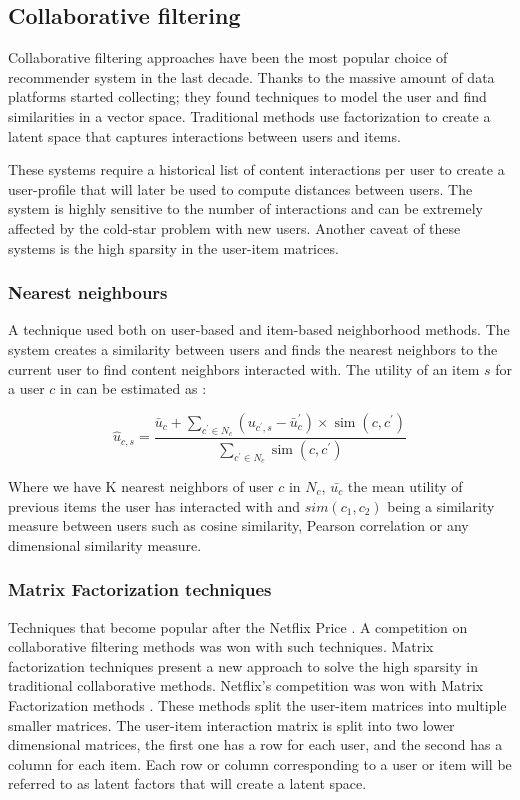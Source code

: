 \documentclass{kththesis}
\begin{document}
\subsection{Collaborative filtering}
Collaborative filtering approaches have been the most popular choice of recommender system in the last decade. Thanks to the massive amount of data platforms started collecting; they found techniques to model the user and find similarities in a vector space. Traditional methods use factorization to create a latent space that captures interactions between users and items.

These systems require a historical list of content interactions per user to create a user-profile that will later be used to compute distances between users. The system is highly sensitive to the number of interactions and can be extremely affected by the cold-star problem with new users. Another caveat of these systems is the high sparsity in the user-item matrices.

\subsubsection{Nearest neighbours}
A technique used both on user-based and item-based neighborhood methods. The system creates a similarity between users and finds the nearest neighbors to the current user to find content neighbors interacted with. The utility of an item $s$ for a user $c$ in can be estimated as \cite{knn}:

\begin{equation}
\hat{u}_{c, s}=\frac{\bar{u}_{c}+\sum_{c^{\prime} \in N_{c}}\left(u_{c^{\prime}, s}-\bar{u}_{c}^{\prime}\right) \times \operatorname{sim}\left(c, c^{\prime}\right)}{\sum_{c^{\prime} \in N_{c}} \operatorname{sim}\left(c, c^{\prime}\right)}
\end{equation}

Where we have K nearest neighbors of user $c$ in $N_c$, $\bar{u_c}$ the mean utility of previous items the user has interacted with and $sim(c_1,c_2)$ being a similarity measure between users such as cosine similarity, Pearson correlation or any dimensional similarity measure.


\subsubsection{Matrix Factorization techniques} \label{als}
Techniques that become popular after the Netflix Price \cite{netflix}. A competition on collaborative filtering methods was won with such techniques. Matrix factorization techniques present a new approach to solve the high sparsity in traditional collaborative methods. Netflix's competition was won with Matrix Factorization methods \cite{matrix}. These methods split the user-item matrices into multiple smaller matrices. The user-item interaction matrix is split into two lower dimensional matrices, the first one has a row for each user, and the second has a column for each item. Each row or column corresponding to a user or item will be referred to as latent factors \cite{latentspace} that will create a latent space.
\end{document}
